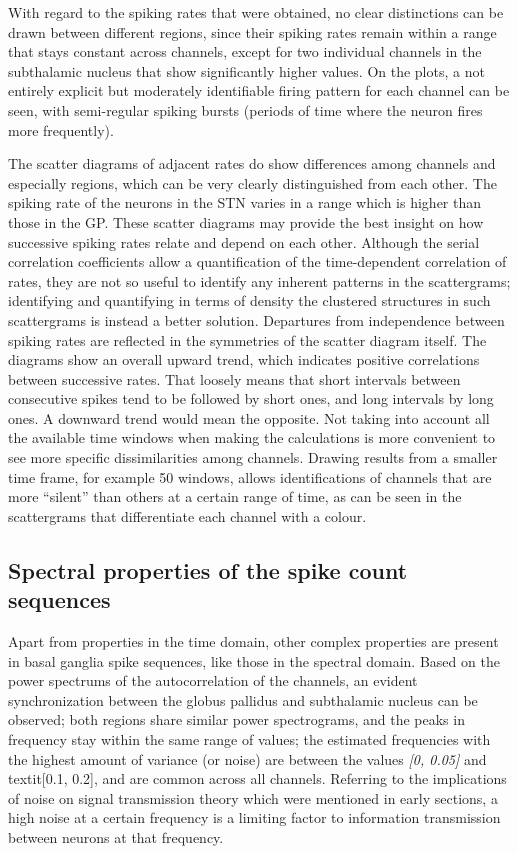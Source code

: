 \documentclass{kththesis}
\begin{document}
With regard to the spiking rates that were obtained, no clear distinctions can be drawn between different regions, since their spiking rates remain within a range that stays constant across channels, except for two individual channels in the subthalamic nucleus that show significantly higher values. On the plots, a not entirely explicit but moderately identifiable firing pattern for each channel can be seen, with semi-regular spiking bursts (periods of time where the neuron fires more frequently). 

The scatter diagrams of adjacent rates do show differences among channels and especially regions, which can be very clearly distinguished from each other. The spiking rate of the neurons in the STN varies in a range which is higher than those in the GP. 
These scatter diagrams may provide the best insight on how successive spiking rates relate and depend on each other. Although the serial correlation coefficients allow a quantification of the time-dependent correlation of rates, they are not so useful to identify any inherent patterns in the scattergrams; identifying and quantifying in terms of density the clustered structures in such scattergrams is instead a better solution. 
Departures from independence between spiking rates are reflected in the symmetries of the scatter diagram itself. The diagrams show an overall upward trend, which indicates positive correlations between successive rates. That loosely means that short intervals between consecutive spikes tend to be followed by short ones, and long intervals by long ones. A downward trend would mean the opposite.
Not taking into account all the available time windows when making the calculations is more convenient to see more specific dissimilarities among channels. Drawing results from a smaller time frame, for example 50 windows, allows identifications of channels that are more “silent” than others at a certain range of time, as can be seen in the scattergrams that differentiate each channel with a colour. 

\subsection{Spectral properties of the spike count sequences}

Apart from properties in the time domain, other complex properties are present in basal ganglia spike sequences, like those in the spectral domain. Based on the power spectrums of the autocorrelation of the channels, an evident synchronization between the globus pallidus and subthalamic nucleus can be observed; both regions share similar power spectrograms, and the peaks in frequency stay within the same range of values; the estimated frequencies with the highest amount of variance (or noise) are between the values \textit{[0, 0.05]} and textit{[0.1, 0.2]}, and are common across all channels. Referring to the implications of noise on signal transmission theory which were mentioned in early sections, a high noise at a certain frequency is a limiting factor to information transmission between neurons at that frequency. 
\end{document}
